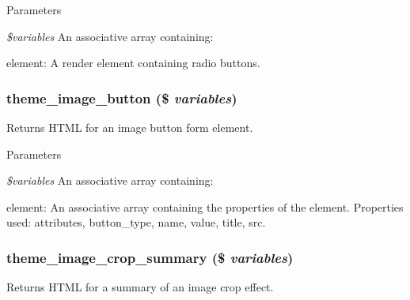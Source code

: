 \begin{DoxyParams}{Parameters}
\item[{\em \$variables}]An associative array containing:
\begin{DoxyItemize}
\item element: A render element containing radio buttons. 
\end{DoxyItemize}\end{DoxyParams}
\hypertarget{group__themeable_ga599eaa99635a647741a19b4c23ed1233}{
\subsubsection[{theme\_\-image\_\-button}]{\setlength{\rightskip}{0pt plus 5cm}theme\_\-image\_\-button (\$ {\em variables})}}
\label{group__themeable_ga599eaa99635a647741a19b4c23ed1233}
Returns HTML for an image button form element.


\begin{DoxyParams}{Parameters}
\item[{\em \$variables}]An associative array containing:
\begin{DoxyItemize}
\item element: An associative array containing the properties of the element. Properties used: attributes, button\_\-type, name, value, title, src. 
\end{DoxyItemize}\end{DoxyParams}
\hypertarget{group__themeable_ga499049d5bb381dd2315dffd36f9a9c43}{
\subsubsection[{theme\_\-image\_\-crop\_\-summary}]{\setlength{\rightskip}{0pt plus 5cm}theme\_\-image\_\-crop\_\-summary (\$ {\em variables})}}
\label{group__themeable_ga499049d5bb381dd2315dffd36f9a9c43}
Returns HTML for a summary of an image crop effect.



